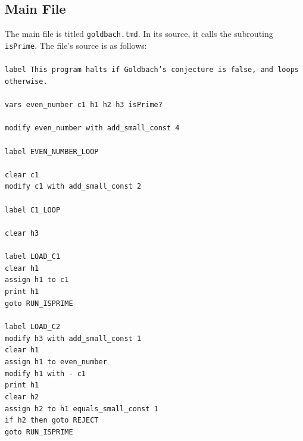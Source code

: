 \documentclass[11pt]{report}
\begin{document}
\subsection{Main File \label{sec:mainfilegoldbach}}

The main file is titled \texttt{goldbach.tmd}. In its source, it calls the subrouting \texttt{isPrime}. The file's source is as follows: \\ \\
{\tt label This program halts if Goldbach's conjecture is false, and loops otherwise. \\ \\
vars even\_number c1 h1 h2 h3 isPrime? \\ \\
modify even\_number with add\_small\_const 4 \\ \\
label EVEN\_NUMBER\_LOOP \\ \\ 
\indent	clear c1 \\ 
\indent	modify c1 with add\_small\_const 2 \\ \\
\indent	label C1\_LOOP \\ \\
\indent \indent	clear h3 \\ \\		
\indent \indent	label LOAD\_C1 \\
\indent \indent	clear h1 \\
\indent \indent	assign h1 to c1 \\
\indent \indent print h1 \\
\indent \indent	goto RUN\_ISPRIME \\ \\
\indent \indent	label LOAD\_C2 \\
\indent \indent	modify h3 with add\_small\_const 1 \\
\indent \indent	clear h1 \\
\indent \indent	assign h1 to even\_number \\
\indent \indent	modify h1 with - c1 \\
\indent \indent	print h1 \\
\indent \indent	clear h2 \\
\indent \indent	assign h2 to h1 equals\_small\_const 1 \\
\indent \indent	if h2 then goto REJECT \\
\indent \indent	goto RUN\_ISPRIME \\ \\
}
\end{document}
